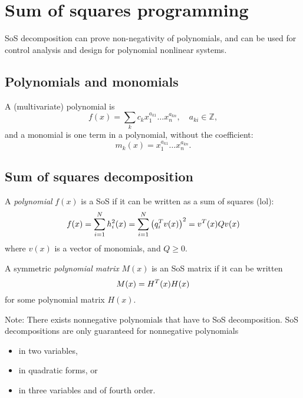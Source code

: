 \section{Sum of squares programming}
SoS decomposition can prove non-negativity of polynomials, and can be used for control analysis and design for polynomial nonlinear systems.

\subsection{Polynomials and monomials}
A (multivariate) polynomial is
%
\begin{equation}
  f(x) = \sum_k c_k x_1^{a_{k1}} \dots x_n^{a_{kn}},\quad a_{ki} \in \mathbb{Z},
\end{equation}
%
and a monomial is one term in a polynomial, without the coefficient:
%
\begin{equation}
  m_k(x) = x_1^{a_{k1}} \dots x_n^{a_{kn}}.
\end{equation}

\subsection{Sum of squares decomposition}
A \emph{polynomial} $f(x)$ is a SoS if it can be written as a sum of squares (lol):
%
\begin{equation}
  f(x) =
  \sum_{i=1}^N h_i^2(x) =
  \sum_{i=1}^N \left(q_i^{T} v(x)\right)^2 =
  v^{T}(x) Q v(x)
\end{equation}
%
where $v(x)$ is a vector of monomials, and $Q \geq 0$.

A symmetric \emph{polynomial matrix} $M(x)$ is an SoS matrix if it can be written
%
\begin{equation}
  M(x) = H^{T}(x) H(x)
\end{equation}
%
for some polynomial matrix $H(x)$.

Note: There exists nonnegative polynomials that have to SoS decomposition. SoS decompositions are only guaranteed for nonnegative polynomials
\begin{itemize}
  \item in two variables,
  \item in quadratic forms, or
  \item in three variables and of fourth order.
\end{itemize}

